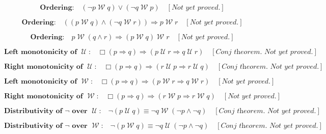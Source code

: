 \documentclass[fleqn, leqno]{article}
\newcommand{\impl}{\ensuremath{\Rightarrow}}        %
\newcommand{\Until}{\;\mathcal{U}\;}
\newcommand{\Wait}{\;\mathcal{W}\;}
\newcommand{\Always}{\Box}
\newcommand{\spacer}{\vspace{-30pt}}
\begin{document}
\spacer

\begin{equation}\label{E:waitOrdering}
\textbf{Ordering:}\quad (\neg p \Wait q) \lor (\neg q \Wait p) \quad [\textit{Not yet proved.}]
\end{equation}

\spacer

\begin{equation}\label{E:waitOrderingTwo}
\textbf{Ordering:}\quad ((p \Wait q) \land (\neg q \Wait r)) \impl p \Wait r \quad [\textit{Not yet proved.}]
\end{equation}

\spacer

\begin{equation}\label{E:waitOrderingThree}
\textbf{Ordering:}\quad p \Wait (q \land r) \impl (p \Wait q) \Wait r \quad [\textit{Not yet proved.}]
\end{equation}

\spacer

\begin{equation}\label{E:leftMonoUntil}
\textbf{Left monotonicity of $\Until$:}\quad \Always (p \impl q) \impl (p \Until r \impl q \Until r) \quad [\textit{Conj theorem. Not yet proved.}]
\end{equation}

\spacer

\begin{equation}\label{E:rightMonoUntil}
\textbf{Right monotonicity of $\Until$:}\quad \Always (p \impl q) \impl (r \Until p \impl r \Until q) \quad [\textit{Conj theorem. Not yet proved.}]
\end{equation}

\spacer

\begin{equation}\label{E:leftMonoWait}
\textbf{Left monotonicity of $\Wait$:}\quad \Always (p \impl q) \impl (p \Wait r \impl q \Wait r) \quad [\textit{Not yet proved.}]
\end{equation}

\spacer

\begin{equation}\label{E:rightMonoWait}
\textbf{Right monotonicity of $\Wait$:}\quad \Always (p \impl q) \impl (r \Wait p \impl r \Wait q) \quad [\textit{Not yet proved.}]
\end{equation}

\spacer

\begin{equation}\label{E:notUntil}
\textbf{Distributivity of $\neg$ over $\Until$:}\quad \neg (p \Until q) \equiv \neg q \Wait (\neg p \land \neg q) \quad [\textit{Conj theorem. Not yet proved.}]
\end{equation}

\spacer

\begin{equation}\label{E:notWait}
\textbf{Distributivity of $\neg$ over $\Wait$:}\quad \neg (p \Wait q) \equiv \neg q \Until (\neg p \land \neg q) \quad [\textit{Conj theorem. Not yet proved.}]
\end{equation}
\end{document}
